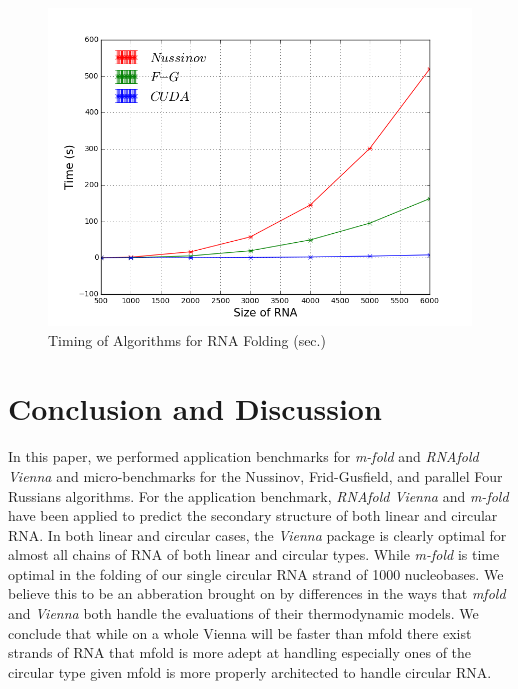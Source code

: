 \documentclass[12pt]{article}
\begin{document}
\begin{figure}[H]
  \centering
  \includegraphics[keepaspectratio, scale=.6]{algorithmGraph.png}
  \caption{Timing of Algorithms for RNA Folding (sec.)}
  \label{fig:timingAlgorithm}
\end{figure}

\section{Conclusion and Discussion}
\par In this paper, we performed application benchmarks for \textit{m-fold} and \textit{RNAfold Vienna} and
micro-benchmarks for the Nussinov, Frid-Gusfield, and parallel Four Russians algorithms. For the
application benchmark, \textit{RNAfold Vienna} and \textit{m-fold} have been applied to predict
the secondary structure of both linear and circular RNA. In both linear and circular cases, the
\textit{Vienna} package is clearly optimal for almost all chains of RNA of both linear and circular types.  While
\textit{m-fold} is time optimal in the folding of our single circular RNA strand of 1000 nucleobases. We
believe this to be an abberation brought on by differences in the ways that \textit{mfold} and \textit{Vienna}
both handle the evaluations of their thermodynamic models. We conclude that while on a whole Vienna will
be faster than mfold there exist strands of RNA that mfold is more adept at handling especially ones of the
circular type given mfold is more properly architected to handle circular RNA.
\end{document}
